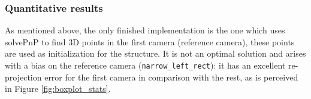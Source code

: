 \subsubsection{Quantitative results}

As mentioned above, the only finished implementation is the one which uses solvePnP to find 3D points in the first camera (reference camera), these points are used as initialization for the structure. It is not an optimal solution and arises with a bias on the reference camera (\texttt{narrow\_left\_rect}): it has an excellent re-projection error for the first camera in comparison with the rest, as is perceived in Figure \ref{fig:boxplot_stats}.

